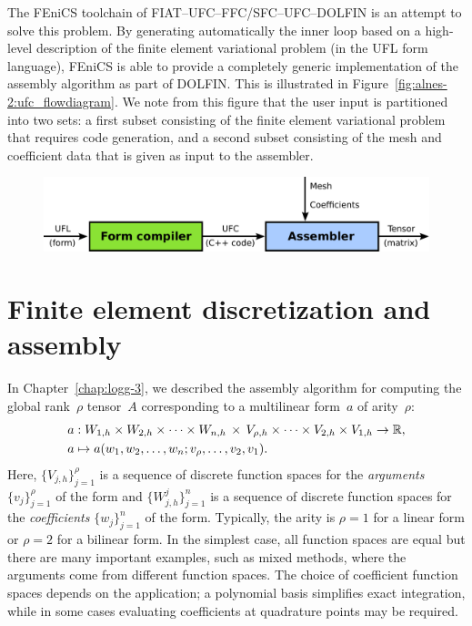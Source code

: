 The FEniCS toolchain of FIAT--UFC--FFC/SFC--UFC--DOLFIN is an attempt
to solve this problem. By generating automatically the inner loop
based on a high-level description of the finite element variational
problem (in the UFL form language), FEniCS is able to provide a
completely generic implementation of the assembly algorithm as part of
DOLFIN. This is illustrated in
Figure~\ref{fig:alnes-2:ufc_flowdiagram}. We note from this figure
that the user input is partitioned into two sets: a first subset
consisting of the finite element variational problem that requires
code generation, and a second subset consisting of the mesh and
coefficient data that is given as input to the assembler.

\begin{figure}
\bwfig
          {\includegraphics[width=\fullfig]{chapters/alnes-2/pdf/ufc_flowdiagram.pdf}}
\end{figure}

\section{Finite element discretization and assembly}
\label{sec:alnes-2fem}

In Chapter~\ref{chap:logg-3}, we described the assembly algorithm for
computing the global rank~$\rho$ tensor~$A$ corresponding to a
multilinear form~$a$ of arity~$\rho$:
\begin{equation} \label{eq:varform}
  \begin{split}
    a &: W_{1,h} \times W_{2,h} \times \cdots \times W_{n,h} \, \times \,
    V_{\rho,h} \times \cdots \times V_{2,h} \times V_{1,h} \rightarrow \mathbb{R}, \\
    a &\mapsto a(w_1, w_2, \ldots, w_n; v_{\rho}, \ldots, v_2, v_1).
  \end{split}
\end{equation}
Here, $\{V_{j,h}\}_{j=1}^{\rho}$ is a sequence of discrete function
spaces for the \emph{arguments} $\{v_j\}_{j=1}^{\rho}$ of the form and
$\{W_{j,h}^j\}_{j=1}^n$ is a sequence of discrete function spaces for
the \emph{coefficients} $\{w_j\}_{j=1}^n$ of the form. Typically, the
arity is $\rho=1$ for a linear form or $\rho=2$ for a bilinear
form. In the simplest case, all function spaces are equal but there
are many important examples, such as mixed methods, where the
arguments come from different function spaces. The choice of
coefficient function spaces depends on the application; a polynomial
basis simplifies exact integration, while in some cases evaluating
coefficients at quadrature points may be required.

